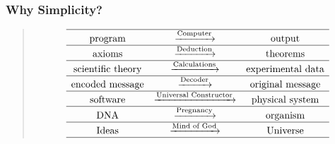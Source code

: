\documentclass[UTF8,11pt,colorlinks,compress,openany]{beamer}%
\begin{document}
\begin{frame}\frametitle{Why Simplicity?}
	\begin{quote}
		\[\begin{array}{ccccc}
		\hline
		\text{program} & \xrightarrow{\text{Computer}} & \text{output}\\
		\hline
		\text{axioms} & \xrightarrow{\text{Deduction}} & \text{theorems}\\
		\hline
		\text{scientific theory} & \xrightarrow{\text{Calculations}} & \text{experimental data}\\
		\hline
		\text{encoded message} & \xrightarrow{\text{Decoder}} & \text{original message}\\
		\hline
		\text{software} & \xrightarrow{\text{Universal Constructor}} & \text{physical system}\\
		\hline
		\text{DNA} & \xrightarrow{\text{Pregnancy}} & \text{organism}\\
		\hline
		\text{Ideas} & \xrightarrow{\text{Mind of God}} & \text{Universe}\\
		\hline
		\end{array}\]
	\end{quote}
\end{frame}
\end{document}
